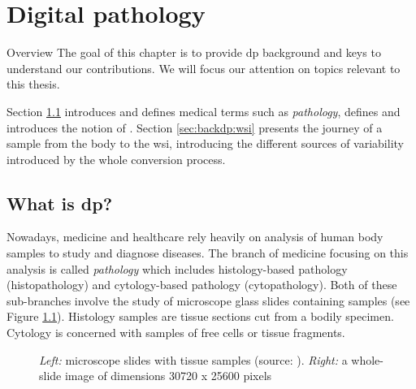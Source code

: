 \chapter{Digital pathology}
\label{chap:backdp}

\begin{overview}{Overview}
  The goal of this chapter is to provide \acrlong{dp} background and keys to understand our contributions. We will focus our attention on topics relevant to this thesis. 
  
  Section \ref{sec:backdp:whatisdp} introduces and defines medical terms such as \textit{pathology}, defines  and introduces the notion of . Section \ref{sec:backdp:wsi} presents the journey of a sample from the body to the \acrshort{wsi}, introducing the different sources of variability introduced by the whole conversion process. 
\end{overview}


\section{What is \acrlong{dp}?}
\label{sec:backdp:whatisdp}

Nowadays, medicine and healthcare rely heavily on analysis of human body samples to study and diagnose diseases. The branch of medicine focusing on this analysis is called \textit{pathology} which includes histology-based pathology (\aka histopathology) and cytology-based pathology (\aka cytopathology). Both of these sub-branches involve the study of microscope glass slides containing samples (see Figure \ref{fig:backdp:glassslides}). Histology samples are tissue sections cut from a bodily specimen. Cytology is concerned with samples of free cells or tissue fragments. 

\begin{figure}
  \centering
  \hspace{1cm}
  \caption{\textit{Left:} microscope slides with tissue samples (source: \parencite{img:glassslides}). \textit{Right:} a whole-slide image of dimensions 30720 x 25600 pixels}
  \label{fig:backdp:glassslides}
\end{figure}

